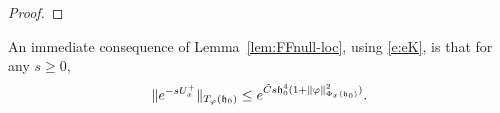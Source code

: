\begin{proof}
\end{proof}

An immediate consequence of Lemma~\ref{lem:FFnull-loc}, using \eqref{e:eK},
is that for any $s \ge 0$,
\begin{equation}
\label{e:Itilbd}
\|e^{-s U^+_x}\|_{T_\varphi(\mathfrak{h}_0)} \leq e^{\tilde C s \mathfrak{h}_0^4 (1 + \|\varphi\|^2_{\Phi_x(\mathfrak{h}_0)})}.
\end{equation}

